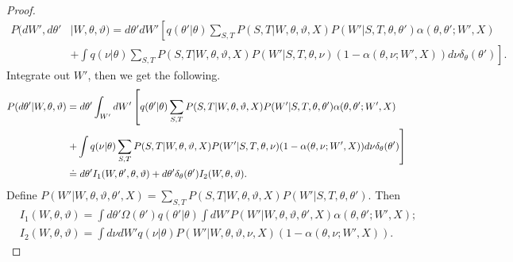 \begin{proof}
\begin{align*}
  P(dW', d\theta'&| W, \theta, \vartheta)
=d\theta' dW' \left[q(\theta' | \theta)
  \sum_{S,T} P(S, T | W, \theta, \vartheta, X)P(W' | S, T, \theta, \theta')
\alpha(\theta, \theta' ; W', X)\right. \\
&\left.+ \int q(\nu | \theta) \sum_{S,T} P(S, T|W,\theta,\vartheta,
    X)P(W' | S, T, \theta, \nu) ( 1 - {\alpha(\theta, \nu ; W', X)})d\nu
    \delta_\theta(\theta')\right].
\end{align*}
Integrate out $W'$, then we get the following.
\begin{align*}
  P(d\theta'| W, \theta, \vartheta) &=d\theta' \int_{W'}dW'
  \left[q(\theta' | \theta)
    \sum_{S,T} P(S, T | W, \theta, \vartheta, X)P(W' | S, T, \theta,
  \theta')\alpha(\theta, \theta' ; W', X)\right.\\
  &\left.  + \int q(\nu | \theta) \sum_{S,T} P(S, T |  W, \theta, \vartheta,
X)P(W' | S, T, \theta, \nu) ( 1 - \alpha(\theta, \nu ; W', X))d\nu
\delta_\theta(\theta')\right] \\
&\doteq d\theta' I_1(W, \theta', \theta, \vartheta) + d\theta'\delta_\theta(\theta')I_2(W, \theta, \vartheta).
\end{align*}
Define $P(W' | W, \theta, \vartheta, \theta', X) =
\sum_{S,T} P(S, T | W, \theta, \vartheta, X)P(W' | S, T, \theta, \theta')$. 
Then
\begin{align*}
  &I_1(W, \theta, \vartheta) = \int d\theta' \Omega(\theta') q(\theta' | \theta)\int dW'P(W' | W, \theta, \vartheta, \theta', X)\alpha(\theta, \theta' ; W', X); \\
&I_2(W, \theta, \vartheta) =\int d\nu  dW'q(\nu | \theta)P(W' | W, \theta, \vartheta, \nu, X)(1 - \alpha(\theta, \nu ; W', X)).
\end{align*}


\end{proof}
